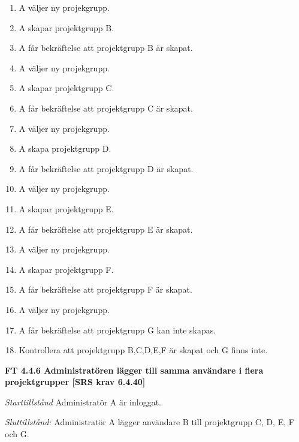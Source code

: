 \documentclass[a4paper]{article}
\begin{document}
\begin{enumerate}
\item A väljer ny projekgrupp.
\item A skapar projektgrupp B.
\item A får bekräftelse att projektgrupp B är skapat.
\item A väljer ny projekgrupp.
\item A skapar projektgrupp C.
\item A får bekräftelse att projektgrupp C är skapat.
\item A väljer ny projekgrupp.
\item A skapa projektgrupp D.
\item A får bekräftelse att projektgrupp D är skapat.
\item A väljer ny projekgrupp.
\item A skapar projektgrupp E.
\item A får bekräftelse att projektgrupp E är skapat.
\item A väljer ny projekgrupp.
\item A skapar projektgrupp F.
\item A får bekräftelse att projektgrupp F är skapat.
\item A väljer ny projekgrupp.
\item A får bekräftelse att projektgrupp G kan inte skapas.
\item Kontrollera att projektgrupp B,C,D,E,F är skapat och G finns inte.
\end{enumerate}

\textbf{FT 4.4.6 Administratören lägger till samma användare i flera projektgrupper [SRS krav 6.4.40]}

\emph{Starttillstånd} Administratör A är inloggat.

\emph{Sluttillstånd:} Administratör A lägger användare B till projektgrupp C, D, E, F och G.
\end{document}
